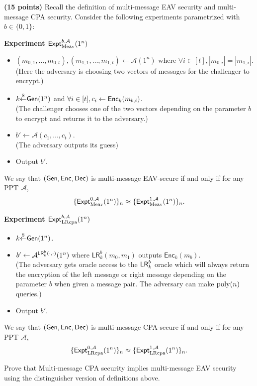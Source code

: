 \documentclass[12pt]{hw}
\newcommand{\getr}{\ensuremath{{\overset{\$}{\leftarrow}}}\xspace}
\begin{document}


\begin{exercise}
  \textbf{(15 points)} 
Recall the definition of multi-message EAV security and multi-message CPA security.
Consider the following experiments parametrized with $b\in\{0,1\}$:
\begin{mdframed}
    {\bf Experiment ${\sf Expt}_{\rm Meav}^{b,\mathcal{A}}(1^n)$}
    \begin{itemize}
        \item $(m_{0,1}, \ldots, m_{0, t}), (m_{1, 1}, \ldots, m_{1, t}) \leftarrow \mathcal{A}(1^n)$ where $\forall i \in [t], |m_{0, i}|=|m_{1, i}|$.\\
        (Here the adversary is choosing two vectors of messages for the challenger to encrypt.)
        \item $k\getr {\sf Gen}(1^n)$ and $\forall i \in [t], c_i \leftarrow {\sf Enc}_k(m_{b, i})$.\\
        (The challenger chooses one of the two vectors depending on the parameter $b$ to encrypt and returns it to the adversary.)
        \item $b'\leftarrow \mathcal{A}(c_1, \ldots, c_t)$.\\
        (The adversary outputs its guess)
        \item Output $b'$.
    \end{itemize}
\end{mdframed}
We say that $({\sf Gen, Enc, Dec})$ is multi-message EAV-secure if and only if for any PPT $\mathcal{A}$, 
\[\{{\sf Expt}_{\rm Meav}^{0,\mathcal{A}}(1^n)\}_n\approx\{{\sf Expt}_{\rm Meav}^{1,\mathcal{A}}(1^n)\}_n.\]

\begin{mdframed}
    {\bf Experiment ${\sf Expt}_{\rm LRcpa}^{b,\mathcal{A}}(1^n)$}
    \begin{itemize}
        \item $k\getr {\sf Gen}(1^n)$.
        \item $b' \leftarrow \mathcal{A}^{{\sf LR}^b_k(\cdot, \cdot)}(1^n)$ where $\mathsf{LR}^b_k(m_0, m_1)$ outputs $\mathsf{Enc}_k(m_b)$.\\
        (The adversary gets oracle access to the ${\sf LR}^b_k$ oracle which will always return the encryption of the left message or right message depending on the parameter $b$ when given a message pair. The adversary can make $\operatorname{poly}(n)$ queries.) 
        \item Output $b'$.
    \end{itemize}
\end{mdframed}
We say that $({\sf Gen, Enc, Dec})$ is multi-message CPA-secure if and only if for any PPT $\mathcal{A}$, 
\[\{{\sf Expt}_{\rm LRcpa}^{0,\mathcal{A}}(1^n)\}_n\approx\{{\sf Expt}_{\rm LRcpa}^{1,\mathcal{A}}(1^n)\}_n.\]
    
Prove that Multi-message CPA security implies multi-message EAV security using the distinguisher version of definitions above.
\end{exercise}
\end{document}
